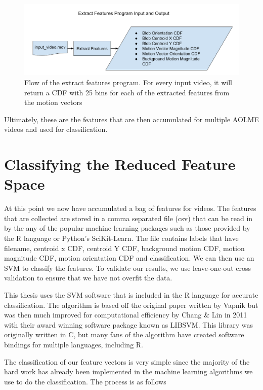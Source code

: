 \begin{figure}[h]
  \centering
  \includegraphics[width=14cm]{figures/extract_features_flow}
  \caption{Flow of the extract features program. For every input video, it will
  return a CDF with 25 bins for each of the extracted features from the motion
  vectors}
  \label{fig:extract_flow}
\end{figure}

Ultimately, these are the features that are then accumulated for multiple AOLME
videos and used for classification.

\section{\label{section:classification}Classifying the Reduced Feature Space}
At this point we now have accumulated a bag of features for videos. The features
that are collected are stored in a comma separated file (csv) that can be read
in by the any of the popular machine learning packages such as those provided
by the R language or Python's SciKit-Learn. The file contains labels that have
filename, centroid x CDF, centroid Y CDF, background motion CDF, motion magnitude
CDF, motion orientation CDF and classification. We can then use an SVM to classify
the features. To validate our results, we use leave-one-out cross validation
to ensure that we have not overfit the data.

This thesis uses the SVM software that is included in the R language for
accurate classification. The algorithm is based off the original paper written
by Vapnik \cite{cortes1995support} but was then much improved for computational
efficiency by Chang \& Lin in 2011 \cite{chang2011libsvm} with their award
winning software package known as LIBSVM. This library was originally written
in C, but many fans of the algorithm have created software bindings for multiple
languages, including R.

The classification of our feature vectors is very simple since the majority of
the hard work has already been implemented in the machine learning algorithms
we use to do the classification. The process is as follows


